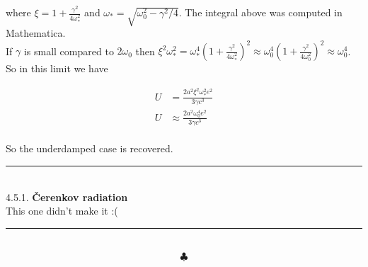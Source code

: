 \documentclass[]{article}
\begin{document}
\begin{enumerate}[a)]
where $\xi = 1 + \frac{\gamma^2}{4 \omega_*^2} $ and $\omega_* = \sqrt{\omega_0^2 - \gamma^2/4}$. The integral above was computed in Mathematica. \\ 

If $\gamma$ is small compared to $2\omega_0$ then $\xi^2 \omega_*^2 = \omega_*^4\left( 1 + \frac{\gamma^2}{4\omega_*^2} \right)^2 \approx \omega_0^4\left( 1 + \frac{\gamma^2}{4\omega_0^2} \right)^2 \approx  \omega_0^4$. So in this limit we have

\begin{equation}
\begin{aligned}
U & = \frac{ 2 a^2 \xi^2 \omega_*^2 e^2}{3 \gamma c^3}  \\
U & \approx  \frac{ 2 a^2 \omega_0^4 e^2}{3 \gamma c^3} 
\end{aligned}
\end{equation} \\

So the underdamped case is recovered. \\







\end{enumerate}

 
\noindent\rule{15cm}{0.4pt} \\



4.5.1. {\bf Čerenkov radiation} \\

This one didn't make it :( 


 
\noindent\rule{15cm}{0.4pt} \\

$$\clubsuit$$
\end{document}
